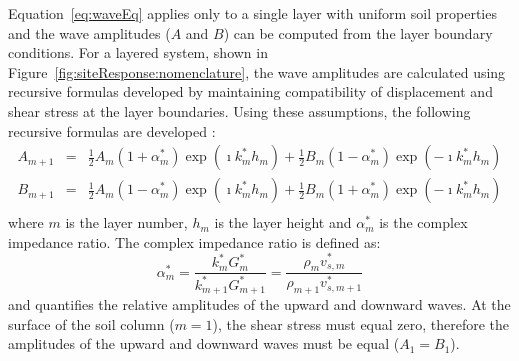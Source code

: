 \documentclass[12pt,oneside]{book}
\begin{document}
Equation~\ref{eq:waveEq} applies only to a single layer with uniform soil
properties and the wave amplitudes ($A$ and $B$) can be computed from the layer
boundary conditions.  For a layered system, shown in
Figure~\ref{fig:siteResponse:nomenclature}, the wave amplitudes are calculated
using recursive formulas developed by maintaining compatibility of displacement
and shear stress at the layer boundaries.  Using these assumptions, the
following recursive formulas are developed \citep{kramer:96}:
\begin{equation}
    \begin{array}{rcl}
        A_{m+1} & = & \frac{1}{2} A_m \left( 1 + \alpha_m^* \right) \exp\left(\imath k_m^* h_m \right) +
        \frac{1}{2} B_m \left( 1 - \alpha_m^* \right) \exp\left(-\imath k_m^* h_m \right)\\
        B_{m+1} & = & \frac{1}{2} A_m \left( 1 - \alpha_m^* \right) \exp\left(\imath k_m^* h_m\right) +
        \frac{1}{2} B_m \left( 1 + \alpha_m^* \right) \exp\left(-\imath k_m^* h_m \right)\\
    \end{array}
\end{equation}
where $m$ is the layer number, $h_m$ is the layer height and $\alpha_m^*$ is the
complex impedance ratio.  The complex impedance ratio is defined as:
\begin{equation}
    \alpha_m^* = \frac{k_m^* G_m^*}{k_{m+1}^* G_{m+1}^*} = \frac{\rho_m v_{s,m}^* }{\rho_{m+1}
    v_{s,m+1}^* }
\end{equation}
and quantifies the relative amplitudes of the upward and downward waves.  At the
surface of the soil column ($m=1$), the shear stress must equal zero, therefore
the amplitudes of the upward and downward waves must be equal ($A_1=B_1$).
\end{document}
